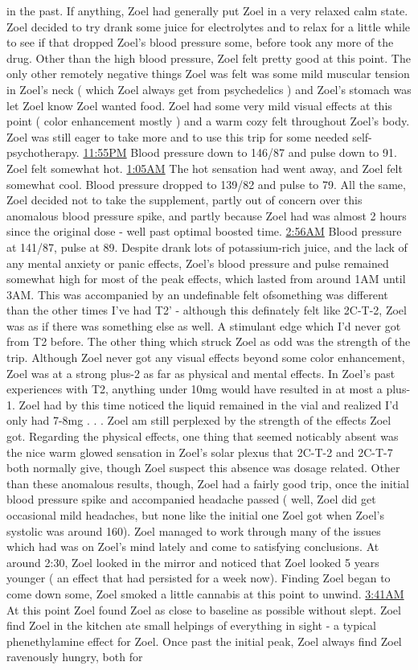 \documentclass[12pt]{book}
\begin{document}
in the past. If anything, Zoel had generally put Zoel in a very relaxed calm state. Zoel decided to try drank some juice for electrolytes and to relax for a little while to see if that dropped Zoel's blood pressure some, before took any more of the drug. Other than the high blood pressure, Zoel felt pretty good at this point. The only other remotely negative things Zoel was felt was some mild muscular tension in Zoel's neck ( which Zoel always get from psychedelics ) and Zoel's stomach was let Zoel know Zoel wanted food. Zoel had some very mild visual effects at this point ( color enhancement mostly ) and a warm cozy felt throughout Zoel's body. Zoel was still eager to take more and to use this trip for some needed self-psychotherapy. \underline{11:55PM} Blood pressure down to 146/87 and pulse down to 91. Zoel felt somewhat hot. \underline{1:05AM} The hot sensation had went away, and Zoel felt somewhat cool. Blood pressure dropped to 139/82 and pulse to 79. All the same, Zoel decided not to take the supplement, partly out of concern over this anomalous blood pressure spike, and partly because Zoel had was almost 2 hours since the original dose - well past optimal boosted time. \underline{2:56AM} Blood pressure at 141/87, pulse at 89. Despite drank lots of potassium-rich juice, and the lack of any mental anxiety or panic effects, Zoel's blood pressure and pulse remained somewhat high for most of the peak effects, which lasted from around 1AM until 3AM. This was accompanied by an undefinable felt ofsomething was different than the other times I've had T2' - although this definately felt like 2C-T-2, Zoel was as if there was something else as well. A stimulant edge which I'd never got from T2 before. The other thing which struck Zoel as odd was the strength of the trip. Although Zoel never got any visual effects beyond some color enhancement, Zoel was at a strong plus-2 as far as physical and mental effects. In Zoel's past experiences with T2, anything under 10mg would have resulted in at most a plus-1. Zoel had by this time noticed the liquid remained in the vial and realized I'd only had 7-8mg . . .  Zoel am still perplexed by the strength of the effects Zoel got. Regarding the physical effects, one thing that seemed noticably absent was the nice warm glowed sensation in Zoel's solar plexus that 2C-T-2 and 2C-T-7 both normally give, though Zoel suspect this absence was dosage related. Other than these anomalous results, though, Zoel had a fairly good trip, once the initial blood pressure spike and accompanied headache passed ( well, Zoel did get occasional mild headaches, but none like the initial one Zoel got when Zoel's systolic was around 160). Zoel managed to work through many of the issues which had was on Zoel's mind lately and come to satisfying conclusions. At around 2:30, Zoel looked in the mirror and noticed that Zoel looked 5 years younger ( an effect that had persisted for a week now). Finding Zoel began to come down some, Zoel smoked a little cannabis at this point to unwind. \underline{3:41AM} At this point Zoel found Zoel as close to baseline as possible without slept. Zoel find Zoel in the kitchen ate small helpings of everything in sight - a typical phenethylamine effect for Zoel. Once past the initial peak, Zoel always find Zoel ravenously hungry, both for 
\end{document}
